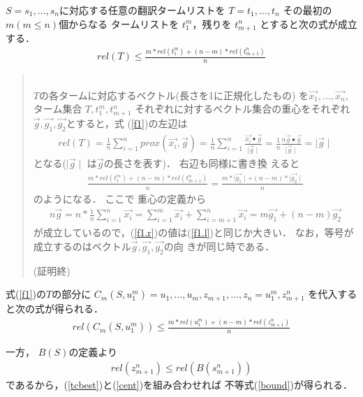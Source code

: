 $S = s_1, \ldots, s_n $に対応する任意の翻訳タームリストを 
$ T = t_1, \ldots , t_n $ その最初の$ m (m \leq n)$個からなる
タームリストを $ t_1^m $，残りを $ t_{m+1}^n$ とすると次の式が成立する． 
\begin{eqnarray}
rel(T) \leq \frac{m * rel(t_1^m) + (n-m) * rel(t_{m+1}^n)}{n} \label{f1}
\end{eqnarray}

\begin{quotation}
\noindent
[証明]\\
\noindent
$T$の各タームに対応するベクトル(長さを1に正規化したもの)
を$\vec{x_1}, \ldots, \vec{x_n}$, ターム集合 $T, t_1^m,t_{m+1}^n$ 
それぞれに対するベクトル集合の重心をそれぞれ $\vec{g}, \vec{g_1}, 
\vec{g_2}$とすると，式 (\ref{f1})の左辺は
\begin{eqnarray}
rel(T) =  \frac{1}{n}\sum_{i = 1}^n prox(\vec{x_i}, \vec{g})  
  =   \frac{1}{n}\sum_{i = 1}^n \frac{\vec{x_i} \bullet \vec{g}}
    {\mid \vec{g} \mid} 
  =  \frac{1}{n}\frac{n \vec{g} \bullet \vec{g}}{\mid \vec{g} \mid} = 
    \mid \vec{g} \mid \label{f1.l}
\end{eqnarray}
\noindent
となる($ \mid \vec{g} \mid $ は$\vec{g}$の長さを表す)． 右辺も同様に書き換
えると
\begin{eqnarray}
\frac{m * rel(t_1^m) + (n-m) * rel(t_{m+1}^n)}{n} 
  =  \frac{m * \mid \vec{g_1} \mid + (n-m) * \mid \vec{g_2} \mid}{n} \label{f1.r}
\end{eqnarray}
\noindent
のようになる． ここで 重心の定義から
\begin{eqnarray}
n\vec{g} = n * \frac{1}{n} \sum_{i = 1}^n \vec{x_i} 
         = \sum_{i = 1}^m \vec{x_i} + \sum_{i = m+1}^n \vec{x_i}
         = m\vec{g_1} + (n-m)\vec{g_2} 
\end{eqnarray}
が成立しているので，(\ref{f1.r})の値は(\ref{f1.l})と同じか大きい． 
なお，等号が成立するのはベクトル$\vec{g}, \vec{g_1}, \vec{g_2}$の向
きが同じ時である． 
\begin{flushright}
(証明終)
\end{flushright}
\end{quotation}

式(\ref{f1})の$T$の部分に $ C_m(S, u_1^m) = u_1, \ldots, u_m, z_{m+1}, 
\ldots,  z_n = u_1^m, z_{m+1}^n$ を代入すると次の式が得られる．
\begin{eqnarray}
rel(C_m(S, u_1^m)) \leq  \frac{m * rel(u_1^m) + (n-m) * rel(z_{m+1}^n)}{n} \label{cent}
\end{eqnarray}

一方， $B(S)$の定義より
\begin{eqnarray}
rel(z_{m+1}^n) \leq rel(B(s_{m+1}^n)) \label{tcbest}
\end{eqnarray}
であるから，(\ref{tcbest})と(\ref{cent})を組み合わせれば
不等式(\ref{bound})が得られる．

